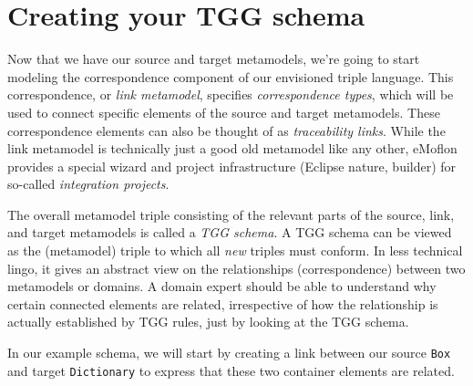\newpage
\hypertarget{TGGSchema}{}
\chapter{Creating your TGG schema}
\genHeader

Now that we have our source and target metamodels, we're going to start modeling the correspondence component of our envisioned triple language. 
This correspondence, or \emph{link metamodel}, specifies \emph{correspondence types}, which will be used to connect specific elements of the source and target metamodels. 
These correspondence elements can also be thought of as \emph{traceability links}.
%
While the link metamodel is technically just a good old metamodel like any other, eMoflon provides a special wizard and project infrastructure (Eclipse nature, builder) for so-called \emph{integration projects}. 

The overall metamodel triple consisting of the relevant parts of the source, link, and target metamodels is called a \emph{TGG schema}.
%
A TGG schema can be viewed as the (metamodel) triple to which all \emph{new} triples must conform. 
In less technical lingo, it gives an abstract view on the relationships (correspondence) between two metamodels or domains. 
A domain expert should be able to understand why certain connected elements are related, irrespective of how the relationship is actually established by TGG rules, just by looking at the TGG schema. 

In our example schema, we will start by creating a link between our source \texttt{Box} and target \texttt{Dictionary} to express that these two container elements are related.

